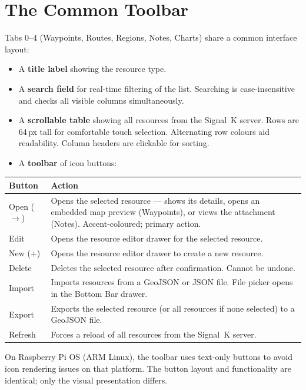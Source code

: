 \section{The Common Toolbar}

Tabs 0--4 (Waypoints, Routes, Regions, Notes, Charts) share a common interface layout:

\begin{itemize}
  \item A \textbf{title label} showing the resource type.
  \item A \textbf{search field} for real-time filtering of the list. Searching is case-insensitive and checks all visible columns simultaneously.
  \item A \textbf{scrollable table} showing all resources from the Signal~K server. Rows are 64\,px tall for comfortable touch selection. Alternating row colours aid readability. Column headers are clickable for sorting.
  \item A \textbf{toolbar} of icon buttons:
\end{itemize}

\begin{longtable}{L{3cm} L{10.7cm}}
\toprule
{}
{\sffamily\bfseries\color{white} Button} &
{\sffamily\bfseries\color{white} Action} \\
\midrule
Open ($\rightarrow$) & Opens the selected resource --- shows its details, opens an embedded map preview (Waypoints), or views the attachment (Notes). Accent-coloured; primary action. \\
Edit & Opens the resource editor drawer for the selected resource. \\
New (+) & Opens the resource editor drawer to create a new resource. \\
Delete & Deletes the selected resource after confirmation. Cannot be undone. \\
Import & Imports resources from a GeoJSON or JSON file. File picker opens in the Bottom Bar drawer. \\
Export & Exports the selected resource (or all resources if none selected) to a GeoJSON file. \\
Refresh & Forces a reload of all resources from the Signal~K server. \\
\bottomrule
\end{longtable}

\begin{notebox}
On Raspberry Pi OS (ARM Linux), the toolbar uses text-only buttons to avoid icon rendering
issues on that platform.
The button layout and functionality are identical; only the visual presentation differs.
\end{notebox}

